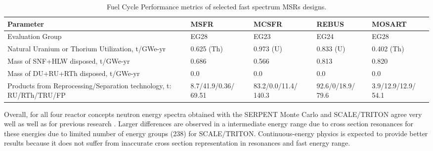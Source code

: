 \documentclass{anstrans}
\begin{document}
\begin{table}[h!]
  \centering
  \caption{Fuel Cycle Performance metrics of selected fast spectrum \glspl{MSR} designs.}
  \label{table:metrics} 
  \begin{tabular}{p{} p{} p{} p{} p{}} \toprule 
   Parameter &  \gls{MSFR} & \gls{MCSFR} & REBUS & \gls{MOSART} \\ \midrule
   Evaluation Group	&  EG28 & EG23 & EG24 & EG28   \\ 
   Natural Uranium or Thorium Utilization, t/GWe-yr & 0.625 (Th) & 0.973 (U) & 0.833 (U) & 0.402 (Th) \\
   Mass of \gls{SNF}+\gls{HLW} disposed, t/GWe-yr & 0.686 & 0.566 & 0.813 &  0.820 \\
   Mass of DU+RU+RTh disposed, t/GWe-yr & 0.0 & 0.0 & 0.0 &  0.0 \\
   Products from Reprocessing/Separation technology, t: \gls{RU}/\gls{RTh}/\gls{TRU}/\gls{FP} &
   8.7/41.9/0.36/ 69.51 &  83.2/0.0/11.4/ 140.3 & 92.6/0/18.9/ 79.6 & 3.9/12.9/12.9/ 54.1  \\
 \bottomrule 
  \end{tabular}
  \vspace{-0.2in}
\end{table}

Overall, for all four reactor concepts neutron energy spectra obtained with the SERPENT Monte Carlo and SCALE/TRITON agree very well as well as for previous research \cite{betzler_fuel_2018}. Larger differences are observed in a intermediate energy range due to cross section resonances for these energies due to limited number of energy groups (238) for SCALE/TRITON. Continuous-energy physics is expected to provide better results because it does not suffer from inaccurate cross section representation in resonances and fast energy range.
\end{document}

